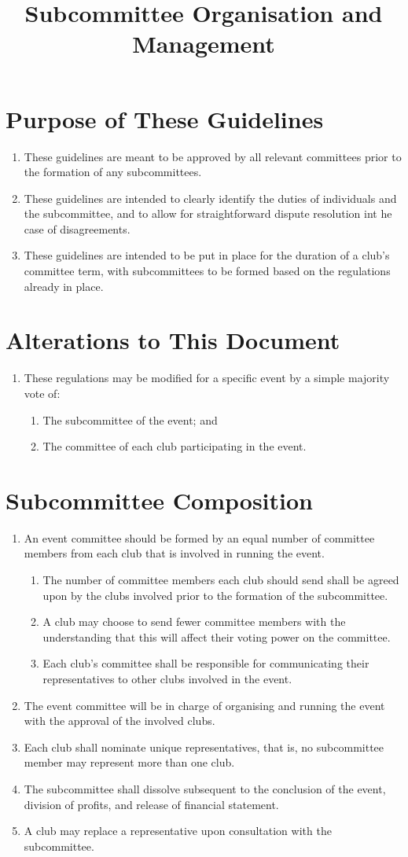 \documentclass[a4paper]{article}
\title{Subcommittee Organisation and Management}
\author{}
\date{}
\newenvironment{enumsection}[1]{\section{#1} \begin{enumerate}[ref=\thesection.\theenumi]}{\end{enumerate}}
\begin{document}
\maketitle

\begin{enumsection}{Purpose of These Guidelines}
    \item These guidelines are meant to be approved by all relevant committees prior to the formation of any subcommittees.
    \item These guidelines are intended to clearly identify the duties of individuals and the subcommittee, and to allow for straightforward dispute resolution int he case of disagreements.
    \item These guidelines are intended to be put in place for the duration of a club's committee term, with subcommittees to be formed based on the regulations already in place.
\end{enumsection}

\begin{enumsection}{Alterations to This Document}
    \item These regulations may be modified for a specific event by a simple majority vote of:
    \begin{enumerate}
        \item The subcommittee of the event; and
        \item The committee of each club participating in the event.
    \end{enumerate}
\end{enumsection}

\begin{enumsection}{Subcommittee Composition}
    \item An event committee should be formed by an equal number of committee members from each club that is involved in running the event.
    \begin{enumerate}
        \item The number of committee members each club should send shall be agreed upon by the clubs involved prior to the formation of the subcommittee.
        \item A club may choose to send fewer committee members with the understanding that this will affect their voting power on the committee.
        \item Each club's committee shall be responsible for communicating their representatives to other clubs involved in the event.
    \end{enumerate}
    \item The event committee will be in charge of organising and running the event with the approval of the involved clubs.
    \item Each club shall nominate unique representatives, that is, no subcommittee member may represent more than one club.
    \item The subcommittee shall dissolve subsequent to the conclusion of the event, division of profits, and release of financial statement.
    \item A club may replace a representative upon consultation with the subcommittee.
\end{enumsection}
\end{document}
